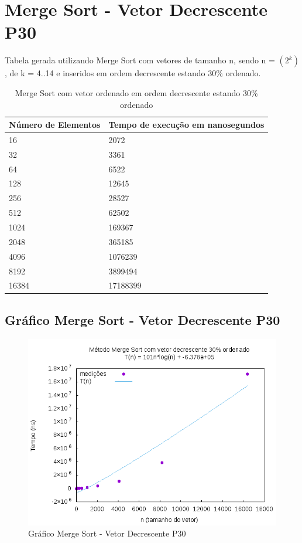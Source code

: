 \documentclass[12pt,a4paper,twoside]{report}
\begin{document}
\section{Merge Sort - Vetor Decrescente P30}
Tabela gerada utilizando Merge Sort com vetores de tamanho n, sendo n = $(2^k)$, de k = 4..14 e inseridos em ordem decrescente estando 30\% ordenado.
\begin{table}[H]
\centering
\caption{Merge Sort com vetor ordenado em ordem decrescente estando 30\% ordenado}
\label{my-label}
\begin{tabular}{|l|l|}
\hline
\multicolumn{1}{|c|}{\textbf{Número de Elementos}} & \multicolumn{1}{c|}{\textbf{Tempo de execução em nanosegundos}} \\ \hline
16 & 2072 \\ \hline
32 & 3361 \\ \hline
64 & 6522 \\ \hline
128 & 12645 \\ \hline
256 & 28527 \\ \hline
512 & 62502 \\ \hline
1024 & 169367 \\ \hline
2048 & 365185 \\ \hline
4096 & 1076239 \\ \hline
8192 & 3899494 \\ \hline
16384 & 17188399 \\ \hline
\end{tabular}
\end{table}

\subsection{Gráfico Merge Sort - Vetor Decrescente P30}
\begin{figure}[H]
    \centering
    \includegraphics[width=0.7\linewidth]{graficos/MergeSort/vIntDecrescenteP30/vIntDecrescenteP30.png}
  \caption{Gráfico Merge Sort - Vetor Decrescente P30}
\end{figure}
\end{document}
